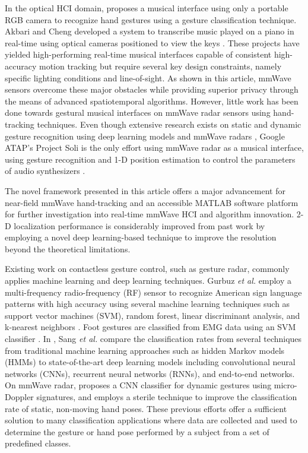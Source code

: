 \documentclass[10pt,journal,final]{IEEEtran}
\begin{document}
In the optical HCI domain, \cite{nieto2013hand} proposes a musical interface using only a portable RGB camera to recognize hand gestures using a gesture classification technique. 
Akbari and Cheng developed a system to transcribe music played on a piano in real-time using optical cameras positioned to view the keys \cite{akbari2015real}. 
These projects have yielded high-performing real-time musical interfaces capable of consistent high-accuracy motion tracking but require several key design constraints, namely specific lighting conditions and line-of-sight. 
As shown in this article, mmWave sensors overcome these major obstacles while providing superior privacy through the means of advanced spatiotemporal algorithms.
However, little work has been done towards gestural musical interfaces on mmWave radar sensors using hand-tracking techniques. 
Even though extensive research exists on static and dynamic gesture recognition using deep learning models and mmWave radars \cite{gurbuz2021american,sang2018micro,kim2016hand,smith2021sterile}, Google ATAP's Project Soli is the only effort using mmWave radar as a musical interface, using gesture recognition and 1-D position estimation to control the parameters of audio synthesizers \cite{bernardo2017_o_soli_mio}. 

The novel framework presented in this article offers a major advancement for near-field mmWave hand-tracking and an accessible MATLAB software platform for further investigation into real-time mmWave HCI and algorithm innovation. 
2-D localization performance is considerably improved from past work \cite{joshi2015wideo} by employing a novel deep learning-based technique to improve the resolution beyond the theoretical limitations.

Existing work on contactless gesture control, such as gesture radar, commonly applies machine learning and deep learning techniques.
Gurbuz \textit{et al.} employ a multi-frequency radio-frequency (RF) sensor to recognize American sign language patterns with high accuracy using several machine learning techniques such as support vector machines (SVM), random forest, linear discriminant analysis, and k-nearest neighbors \cite{gurbuz2021american}.
Foot gestures are classified from EMG data using an SVM classifier \cite{maragliulo2019foot}. 
In \cite{sang2018micro}, Sang \textit{et al.} compare the classification rates from several techniques from traditional machine learning approaches such as hidden Markov models (HMMs) to state-of-the-art deep learning models including convolutional neural networks (CNNs), recurrent neural networks (RNNs), and end-to-end networks. 
On mmWave radar, \cite{kim2016hand} proposes a CNN classifier for dynamic gestures using micro-Doppler signatures, and \cite{smith2021sterile} employs a sterile technique to improve the classification rate of static, non-moving hand poses.
These previous efforts offer a sufficient solution to many classification applications where data are collected and used to determine the gesture or hand pose performed by a subject from a set of predefined classes.
\end{document}
